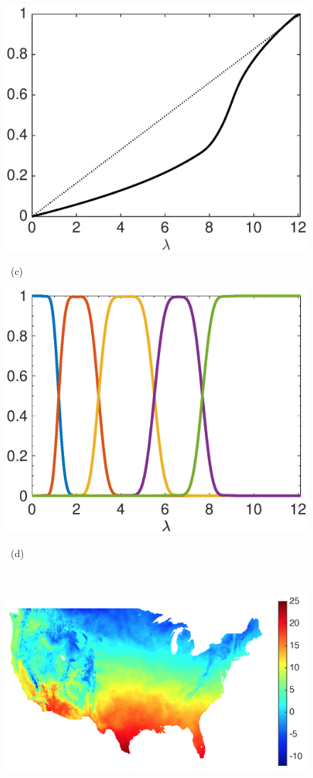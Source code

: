 \documentclass[journal, 10pt]{IEEEtran}
\begin{document}
\begin{figure}[tb]
\begin{minipage}[m]{0.24\linewidth}
\centerline{\includegraphics[width=1\linewidth]{fig_temp_cdf}}
\centerline{~\small{(c)}}
\end{minipage} 
\begin{minipage}[m]{0.24\linewidth}
\centerline{\includegraphics[width=1\linewidth]{fig_temp_fb}}
\centerline{~\small{(d)}}
\end{minipage} \medskip \\
\begin{minipage}[m]{0.24\linewidth}
\centerline{\includegraphics[width=1\linewidth]{fig_temp_signal}}

\end{minipage}
\end{figure}
\end{document}
